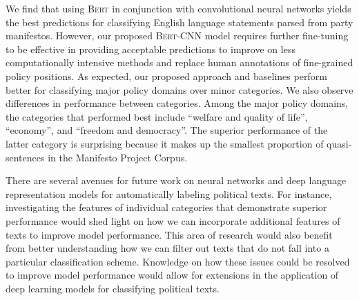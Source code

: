 \documentclass[11pt]{article}
\begin{document}
We find that using \textsc{Bert} in conjunction with convolutional neural networks yields the best predictions for classifying English language statements parsed from party manifestos. However, our proposed \textsc{Bert}-CNN model requires further fine-tuning to be effective in providing  acceptable predictions to improve on less computationally intensive methods and replace human annotations of fine-grained policy positions. As expected, our proposed approach and baselines perform better for classifying major policy domains over minor categories. We also observe differences in performance between categories. Among the major policy domains, the categories that performed best include ``welfare and quality of life'', ``economy'', and ``freedom and democracy''. The superior performance of the latter category is surprising because it makes up the smallest proportion of quasi-sentences in the Manifesto Project Corpus.

There are several avenues for future work on neural networks and deep language representation models for automatically labeling political texts. For instance, investigating the features of individual categories that demonstrate superior performance would shed light on how we can incorporate additional features of texts to improve model performance. This area of research would also benefit from better understanding how we can filter out texts that do not fall into a particular classification scheme. Knowledge on how these issues could be resolved to improve model performance would allow for extensions in the application of deep learning models for classifying political texts.







\end{document}
